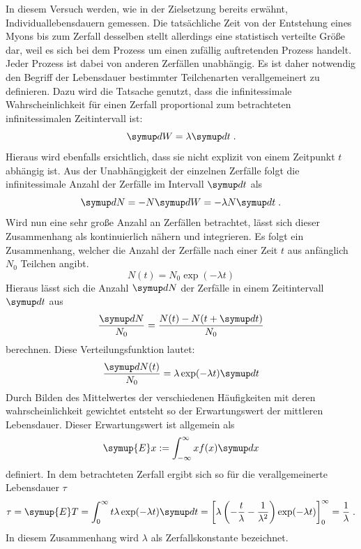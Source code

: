 In diesem Versuch werden, wie in der Zielsetzung bereits erwähnt, Individuallebensdauern gemessen. Die tatsächliche Zeit
von der Entstehung eines Myons bis zum Zerfall desselben stellt allerdings eine statistisch verteilte Größe dar, weil es
sich bei dem Prozess um einen zufällig auftretenden Prozess handelt. Jeder Prozess ist dabei von anderen Zerfällen
unabhängig. Es ist daher notwendig den Begriff der Lebensdauer bestimmter Teilchenarten verallgemeinert zu definieren.
Dazu wird die Tatsache genutzt, dass die infinitessimale Wahrscheinlichkeit für einen Zerfall proportional zum
betrachteten infinitessimalen Zeitintervall ist:
%
\begin{equation}
  \upd W=\lambda\upd t \; .
\end{equation}
%
Hieraus wird ebenfalls ersichtlich, dass sie nicht explizit von einem Zeitpunkt $t$ abhängig ist. Aus der Unabhängigkeit
der einzelnen Zerfälle folgt die infinitessimale Anzahl der Zerfälle im Intervall $\upd t$ als
%
\begin{equation}
  \upd N=-N\upd W=-\lambda N\upd t \; .
\end{equation}
%
Wird nun eine sehr große Anzahl an Zerfällen betrachtet, lässt sich dieser Zusammenhang als kontinuierlich nähern und
integrieren. Es folgt ein Zusammenhang, welcher die Anzahl der Zerfälle nach einer Zeit $t$ aus anfänglich $N_0$
Teilchen angibt.
%
\begin{equation}
  N(t)=N_0\exp(-\lambda t)
\end{equation}
%
Hieraus lässt sich die Anzahl $\upd N$ der Zerfälle in einem Zeitintervall $\upd t$ aus
%
\begin{equation}
  \frac{\upd N}{N_0}=\frac{N(t)-N(t+\upd t)}{N_0}
\end{equation}
%
berechnen. Diese Verteilungsfunktion lautet:
%
\begin{equation}
  \frac{\upd N(t)}{N_0}=\lambda\exp(-\lambda t)\upd t
\end{equation}
%
Durch Bilden des Mittelwertes der verschiedenen Häufigkeiten mit deren wahrscheinlichkeit gewichtet entsteht so der
Erwartungswert der mittleren Lebensdauer. Dieser Erwartungswert ist allgemein als
%
\begin{equation}
  \symup{E}x:=\int_{-\infty}^{\infty}xf(x)\upd x
\end{equation}
%
definiert. In dem betrachteten Zerfall ergibt sich so für die verallgemeinerte Lebensdauer $\tau$
%
\begin{equation}
  \tau=\symup{E}T=\int_0^\infty t\lambda\exp(-\lambda t)\upd t=\left[\lambda\left(-\frac{t}{\lambda}-\frac{1}{\lambda^2}\right)\exp(-\lambda t)\right]^\infty_0=\frac{1}{\lambda} \; .
\end{equation}
%
In diesem Zusammenhang wird $\lambda$ als Zerfallskonstante bezeichnet.
